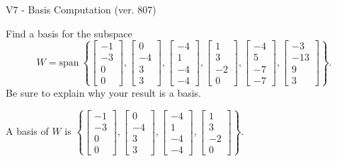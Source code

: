 \begin{exercise}
  \begin{exerciseTitle}V7 - Basis Computation (ver. 807)\end{exerciseTitle}
  \begin{exerciseStatement}
    Find a basis for the subspace 
\[W=\mathrm{span}\ \left\{\left[\begin{array}{r}
-1 \\
-3 \\
0 \\
0
\end{array}\right] , \left[\begin{array}{r}
0 \\
-4 \\
3 \\
3
\end{array}\right] , \left[\begin{array}{r}
-4 \\
1 \\
-4 \\
-4
\end{array}\right] , \left[\begin{array}{r}
1 \\
3 \\
-2 \\
0
\end{array}\right] , \left[\begin{array}{r}
-4 \\
5 \\
-7 \\
-7
\end{array}\right] , \left[\begin{array}{r}
-3 \\
-13 \\
9 \\
3
\end{array}\right]\right\}.\]
 Be sure to explain why your result is a basis.


  \end{exerciseStatement}
  \begin{exerciseAnswer}
   A basis of \(W\) is  \(\left\{\left[\begin{array}{r}
-1 \\
-3 \\
0 \\
0
\end{array}\right] , \left[\begin{array}{r}
0 \\
-4 \\
3 \\
3
\end{array}\right] , \left[\begin{array}{r}
-4 \\
1 \\
-4 \\
-4
\end{array}\right] , \left[\begin{array}{r}
1 \\
3 \\
-2 \\
0
\end{array}\right]\right\}\).
  


  \end{exerciseAnswer}
\end{exercise}